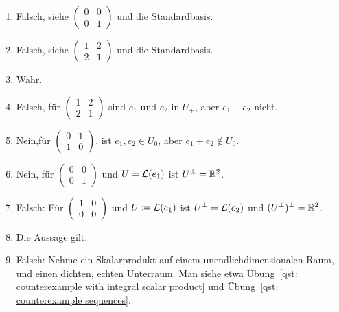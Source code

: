 \begin{solution}
  \begin{enumerate}[leftmargin=*]
    \item
      Falsch, siehe
      $
       \begin{pmatrix}
        0 & 0 \\
        0 & 1
       \end{pmatrix}
      $
      und die Standardbasis.
    \item
      Falsch, siehe
      $
        \begin{pmatrix}
          1 & 2 \\
          2 & 1
        \end{pmatrix}
      $
      und die Standardbasis.
    \item
      Wahr.
    \item
      Falsch, für
      $
        \begin{pmatrix}
          1 & 2 \\
          2 & 1
        \end{pmatrix}
      $
      sind $e_1$ und $e_2$ in $U_+$, aber $e_1 - e_2$ nicht.
    \item
      Nein,für
      $
        \begin{pmatrix}
          0 & 1 \\
          1 & 0
        \end{pmatrix}.
      $
      ist $e_1, e_2 \in U_0$, aber $e_1 + e_2 \notin U_0$.
    \item
      Nein, für
      $
        \begin{pmatrix}
          0 & 0 \\
          0 & 1
        \end{pmatrix}
      $
      und $U = \operatorname{\mathcal{L}}(e_1)$ ist $U^\perp = \mathbb{R}^2$.
    \item
      Falsch:
      Für
      $
        \begin{pmatrix}
          1 & 0 \\
          0 & 0
        \end{pmatrix}
      $
      und $U \coloneqq \operatorname{\mathcal{L}}(e_1)$ ist $U^\perp = \operatorname{\mathcal{L}}(e_2)$ und $(U^\perp)^\perp = \mathbb{R}^2$.
    \item
      Die Aussage gilt.
    \item
      Falsch:
      Nehme ein Skalarprodukt auf einem unendlichdimensionalen Raum, und einen dichten, echten Unterraum.
      Man siehe etwa Übung~\ref{qst: counterexample with integral scalar product} und Übung~\ref{qst: counterexample sequences}.
  \end{enumerate}
\end{solution}


